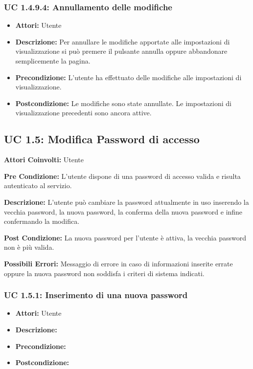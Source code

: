 \subsubsection{UC 1.4.9.4: Annullamento delle modifiche}

\begin{itemize}
\item \textbf{Attori:} Utente
\item \textbf{Descrizione:} Per annullare le modifiche apportate alle impostazioni di visualizzazione si può premere il pulsante annulla oppure abbandonare semplicemente la pagina.
\item \textbf{Precondizione:} L'utente ha effettuato delle modifiche alle impostazioni di visualizzazione.
\item \textbf{Postcondizione:} Le modifiche sono state annullate. Le impostazioni di visualizzazione precedenti sono ancora attive. 
\end{itemize}



\subsection{UC 1.5: Modifica Password di accesso}

\textbf{Attori Coinvolti:}
Utente

\textbf{Pre Condizione:}
L'utente dispone di una password di accesso valida e risulta autenticato al servizio.

\textbf{Descrizione:}
L'utente può cambiare la password attualmente in uso inserendo la vecchia password, la nuova password, la conferma della nuova password e infine confermando la modifica.

\textbf{Post Condizione:}
La nuova password per l'utente è attiva, la vecchia password non è più valida.

\textbf{Possibili Errori:}
Messaggio di errore in caso di informazioni inserite errate oppure la nuova password non soddisfa i criteri di sistema indicati.

\subsubsection{UC 1.5.1: Inserimento di una nuova password}

\begin{itemize}
\item \textbf{Attori:} Utente
\item \textbf{Descrizione:} 
\item \textbf{Precondizione:} 
\item \textbf{Postcondizione:} 
\end{itemize}

